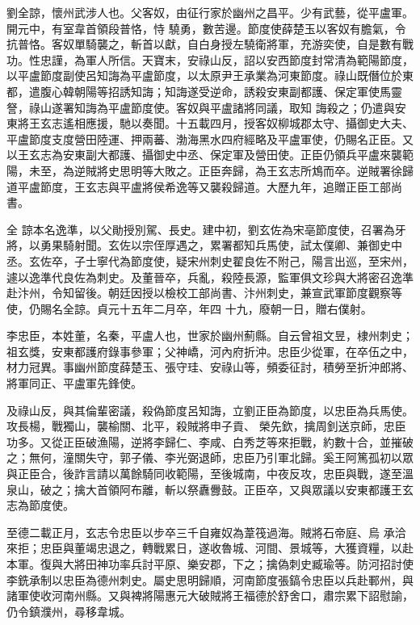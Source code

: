 \begin{pinyinscope}
 劉全諒，懷州武涉人也。父客奴，由征行家於幽州之昌平。少有武藝，從平盧軍。開元中，有室韋首領段普恪，恃
 驍勇，數苦邊。節度使薛楚玉以客奴有膽氣，令抗普恪。客奴單騎襲之，斬首以獻，自白身授左驍衛將軍，充游奕使，自是數有戰功。性忠謹，為軍人所信。天寶末，安祿山反，詔以安西節度封常清為範陽節度，以平盧節度副使呂知誨為平盧節度，以太原尹王承業為河東節度。祿山既僭位於東都，遣腹心韓朝陽等招誘知誨；知誨遂受逆命，誘殺安東副都護、保定軍使馬靈詧，祿山遂署知誨為平盧節度使。客奴與平盧諸將同議，取知
 誨殺之；仍遣與安東將王玄志遙相應援，馳以奏聞。十五載四月，授客奴柳城郡太守、攝御史大夫、平盧節度支度營田陸運、押兩蕃、渤海黑水四府經略及平盧軍使，仍賜名正臣。又以王玄志為安東副大都護、攝御史中丞、保定軍及營田使。正臣仍領兵平盧來襲範陽，未至，為逆賊將史思明等大敗之。正臣奔歸，為王玄志所鴆而卒。逆賊署徐歸道平盧節度，王玄志與平盧將侯希逸等又襲殺歸道。大歷九年，追贈正臣工部尚書。



 全
 諒本名逸準，以父勛授別駕、長史。建中初，劉玄佐為宋亳節度使，召署為牙將，以勇果騎射聞。玄佐以宗侄厚遇之，累署都知兵馬使，試太僕卿、兼御史中丞。玄佐卒，子士寧代為節度使，疑宋州刺史翟良佐不附己，陽言出巡，至宋州，遽以逸準代良佐為刺史。及董晉卒，兵亂，殺陸長源，監軍俱文珍與大將密召逸準赴汴州，令知留後。朝廷因授以檢校工部尚書、汴州刺史，兼宣武軍節度觀察等使，仍賜名全諒。貞元十五年二月卒，年四
 十九，廢朝一日，贈右僕射。



 李忠臣，本姓董，名秦，平盧人也，世家於幽州薊縣。自云曾祖文昱，棣州刺史；祖玄獎，安東都護府錄事參軍；父神嶠，河內府折沖。忠臣少從軍，在卒伍之中，材力冠異。事幽州節度薛楚玉、張守珪、安祿山等，頻委征討，積勞至折沖郎將、將軍同正、平盧軍先鋒使。



 及祿山反，與其倫輩密議，殺偽節度呂知誨，立劉正臣為節度，以忠臣為兵馬使。攻長楊，戰獨山，襲榆關、北平，殺賊將申子貢、
 榮先欽，擒周釗送京師，忠臣功多。又從正臣破漁陽，逆將李歸仁、李咸、白秀芝等來拒戰，約數十合，並摧破之；無何，潼關失守，郭子儀、李光弼退師，忠臣乃引軍北歸。奚王阿篤孤初以眾與正臣合，後詐言請以萬餘騎同收範陽，至後城南，中夜反攻，忠臣與戰，遂至溫泉山，破之；擒大首領阿布離，斬以祭纛釁鼓。正臣卒，又與眾議以安東都護王玄志為節度使。



 至德二載正月，玄志令忠臣以步卒三千自雍奴為葦筏過海。賊將石帝庭、烏
 承洽來拒；忠臣與董竭忠退之，轉戰累日，遂收魯城、河間、景城等，大獲資糧，以赴本軍。復與大將田神功率兵討平原、樂安郡，下之；擒偽刺史臧瑜等。防河招討使李銑承制以忠臣為德州刺史。屬史思明歸順，河南節度張鎬令忠臣以兵赴鄆州，與諸軍使收河南州縣。又與裨將陽惠元大破賊將王福德於舒舍口，肅宗累下詔慰諭，仍令鎮濮州，尋移韋城。




\end{pinyinscope}
